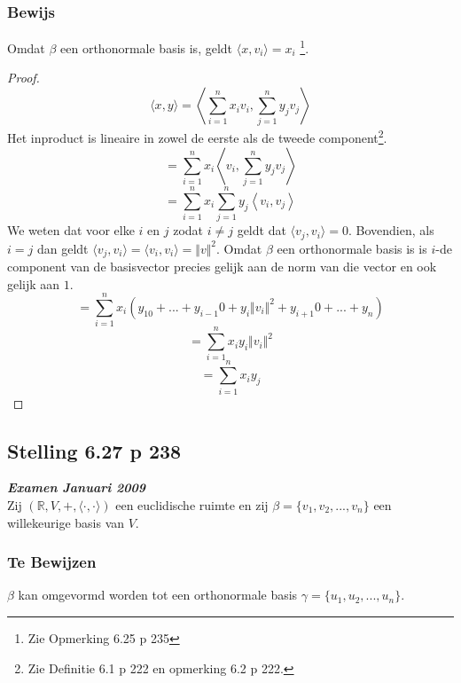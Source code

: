 \documentclass[lineaire_algebra_oplossingen.tex]{subfiles}
\begin{document}
\subsubsection*{Bewijs}
Omdat $\beta$ een orthonormale basis is, geldt $\langle x, v_i \rangle = x_i$ \footnote{Zie Opmerking 6.25 p 235}.
\begin{proof}
\[
\langle x,y\rangle = \left\langle \sum_{i=1}^nx_iv_i,\sum_{j=1}^ny_jv_j \right\rangle
\]
Het inproduct is lineaire in zowel de eerste als de tweede component\footnote{Zie Definitie 6.1 p 222 en opmerking 6.2 p 222.}.
\[
= \sum_{i=1}^nx_i \left\langle v_i,\sum_{j=1}^ny_jv_j \right\rangle
\]
\[
= \sum_{i=1}^nx_i \sum_{j=1}^n y_j \left\langle v_i,v_j \right\rangle
\]
We weten dat voor elke $i$ en $j$ zodat $i\neq j$ geldt dat $\langle v_j, v_i \rangle = 0$. Bovendien, als $i=j$ dan geldt $\langle v_j, v_i \rangle = \langle v_i, v_i \rangle = \Vert v\Vert^2$.
Omdat $\beta$ een orthonormale basis is is $i$-de component van de basisvector precies gelijk aan de norm van die vector en ook gelijk aan $1$. 
\[
= \sum_{i=1}^nx_i  (y_10+...+y_{i-1}0+y_i\Vert v_i\Vert^2+y_{i+1}0+...+y_n)
\]
\[
= \sum_{i=1}^n x_i y_i \Vert v_i\Vert^2
\]
\[
= \sum_{i=1}^nx_i y_j
\]
\end{proof}


\subsection{Stelling 6.27 p 238}
\label{6.27}
\textit{\textbf{Examen Januari 2009}}\\
Zij $(\mathbb{R}, V,+, \langle \cdot,\cdot \rangle)$ een euclidische ruimte en zij $\beta = \{v_1,v_2,...,v_n\}$ een willekeurige basis van $V$.

\subsubsection*{Te Bewijzen}
$\beta$ kan omgevormd worden tot een orthonormale basis $\gamma = \{u_1,u_2,...,u_n\}$.
\end{document}
